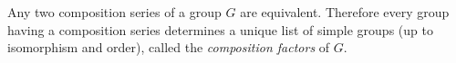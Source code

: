 Any two composition series of a group $G$ are equivalent. Therefore every group having a composition series determines a unique list of simple groups (up to isomorphism and order), called the \emph{composition factors} of $G$.
